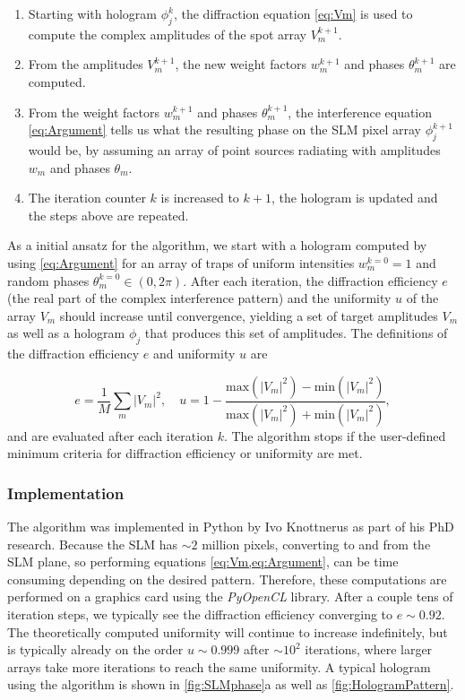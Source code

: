 \begin{enumerate}
    \item Starting with hologram $\phi_j^k$, the diffraction equation \cref{eq:Vm} is used to compute the complex amplitudes of the spot array $V_m^{k+1}$. 
    
    \item From the amplitudes $V_m^{k+1}$, the new weight factors $w_m^{k+1}$ and phases $\theta_m^{k+1}$ are computed.
    
    \item From the weight factors $w_m^{k+1}$ and phases $\theta_m^{k+1}$, the interference equation \cref{eq:Argument} tells us what the resulting phase on the SLM pixel array $\phi_j^{k+1}$ would be, by assuming an array of point sources radiating with amplitudes $w_m$ and phases $\theta_m$.
    
    \item The iteration counter $k$ is increased to $k+1$, the hologram is updated and the steps above are repeated.
\end{enumerate}
As a initial ansatz for the algorithm, we start with a hologram computed by using \cref{eq:Argument} for an array of traps of uniform intensities $w_m^{k=0} = 1$ and random phases $\theta_m^{k=0} \in (0, 2\pi)$.
After each iteration, the diffraction efficiency $e$ (the real part of the complex interference pattern) and the uniformity $u$ of the array $V_m$ should increase until convergence, yielding a set of target amplitudes $V_m$ as well as a hologram $\phi_j$ that produces this set of amplitudes.
The definitions of the diffraction efficiency $e$ and uniformity $u$ are 

\begin{equation}\label{eq:EfficiencyUniformity}
    e = \frac{1}{M}\sum_m |V_m|^2, 
    \quad 
    u = 1-\frac{\text{max}(|V_m|^2)-\text{min}(|V_m|^2)}{\text{max}(|V_m|^2)+\text{min}(|V_m|^2)},
\end{equation}
and are evaluated after each iteration $k$. 
The algorithm stops if the user-defined minimum criteria for diffraction efficiency or uniformity are met.

\subsubsection*{Implementation}

The algorithm was implemented in Python by Ivo Knottnerus as part of his PhD research.
Because the SLM has $\sim 2$ million pixels, converting to and from the SLM plane, so performing equations \cref{eq:Vm,eq:Argument}, can be time consuming depending on the desired pattern.
Therefore, these computations are performed on a graphics card using the \textit{PyOpenCL} library. 
After a couple tens of iteration steps, we typically see the diffraction efficiency converging to $e \sim 0.92$.
The theoretically computed uniformity will continue to increase indefinitely, but is typically already on the order $u \sim 0.999$ after $\sim 10^2$ iterations, where larger arrays take more iterations to reach the same uniformity.
A typical hologram using the algorithm is shown in \ref{fig:SLMphase}a as well as \ref{fig:HologramPattern}.


